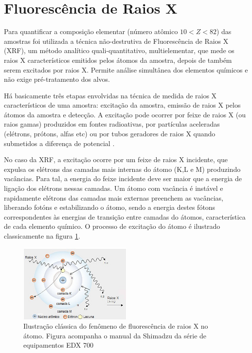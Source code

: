 \section{Fluorescência de Raios X}

Para quantificar a composição elementar (número atômico $ 10 < Z < 82$) das 
amostras foi utilizada a técnica não-destrutiva de Fluorescência de Raios X 
(XRF), um método analítico quali-quantitativo, multielementar, 
que mede os raios X característicos emitidos pelos átomos da amostra, 
depois de também serem excitados por raios X. Permite análise simultânea dos 
elementos químicos e não exige pré-tratamento dos alvos.

Há basicamente três etapas envolvidas na técnica de medida de raios X 
característicos de uma amostra: excitação da amostra, emissão de raios X pelos 
átomos da amostra e detecção. 
A excitação pode ocorrer por feixe de raios X (ou raios gamas) 
produzidos em fontes radioativas, por partículas aceleradas 
(elétrons, prótons, alfas etc) ou por tubos geradores de raios X 
quando submetidos a diferença de potencial \citep{jenkins1988}. 

No caso da XRF, a excitação ocorre por um feixe de raios X incidente, que  
expulsa os elétrons das camadas mais internas do átomo (K,L e M) 
produzindo vacâncias. Para tal, a energia do feixe incidente deve ser maior 
que a energia de ligação dos elétrons nessas camadas. Um átomo com vacância é 
instável e rapidamente elétrons das camadas mais externas preenchem as vacâncias,
liberando fotóns e estabilizando o átomo, sendo a energia destes fótons 
correspondentes às energias de transição entre camadas do átomos, 
característica de cada elemento químico. O processo de excitação do átomo 
é ilustrado classicamente na figura \ref{fig:shimadzu_atomo}.
\begin{figure}[H]
\begin{center} 
  \includegraphics[width=0.5\textwidth]{../inputs/images/shimadzu_atomo.jpg}
  \caption{Ilustração clássica do fenômeno de fluorescência de raios X no átomo. 
           Figura acompanha o manual da Shimadzu da série de equipamentos
           EDX 700 \label{fig:shimadzu_atomo}}
\end{center}
\end{figure}

